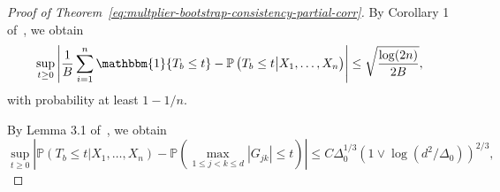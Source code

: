 \documentclass[11pt]{article}
\begin{document}
\begin{appendices}
\begin{proof}[Proof of Theorem~\ref{eq:multplier-bootstrap-consistency-partial-corr}]
By Corollary 1 of~\cite{massart1990tight}, we obtain
\[
\sup_{t\ge0}\left|\frac{1}{B}\sum_{i=1}^n \mathbbm{1}\{T_b \le t\} - \mathbb{P}\left(T_b \le t\big|X_1,\ldots,X_n\right)\right| \le \sqrt{\frac{\log(2n)}{2B}},
\]
with probability at least $1 - 1/n$. 

By Lemma 3.1 of~\cite{Cher13}, we obtain
\begin{equation}\label{eq:gaussian-comparison-partial-corr}
\sup_{t\ge0}\left|\mathbb{P}(T_b \le t|X_1,\ldots,X_n) - \mathbb{P}\left(\max_{1\le j < k\le d}|G_{jk}| \le t\right)\right| \le C\Delta_0^{1/3}(1\vee\log(d^2/\Delta_0))^{2/3},
\end{equation}

\end{proof}
\end{appendices}
\end{document}
